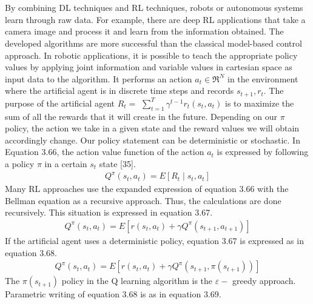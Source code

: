 \documentclass[12pt,twoside,a4]{mwbk}
\begin{document}
\\ \\
By combining DL techniques and RL techniques, robots or autonomous systems learn through raw data. For example, there are deep RL applications that take a camera image and process it and learn from the information obtained. The developed algorithms are more successful than the classical model-based control approach. In robotic applications, it is possible to teach the appropriate policy values by applying joint information and variable values in cartesian space as input data to the algorithm. It performs an action $a_{t} \in \mathfrak{R}^{N}$ in the environment where the artificial agent is in discrete time steps and records $s_{t+1}, r_{t}$. The purpose of the artificial agent $R_{t}=$ $\sum_{t=1}^{T} \gamma^{t-1} r_{t}\left(s_{t}, a_{t}\right)$ is to maximize the sum of all the rewards that it will create in the future. Depending on our $\pi$ policy, the action we take in a given state and the reward values we will obtain accordingly change. Our policy statement can be deterministic or stochastic. In Equation 3.66, the action value function of the action $a_{t}$ is expressed by following a policy $\pi$ in a certain $s_{t}$ state [35].
\begin{subequations}
\begin{align}
    Q^{\pi}\left(s_{t}, a_{t}\right)=E\left[R_{t} \mid s_{t}, a_{t}\right]
\end{align}
\end{subequations}
Many RL approaches use the expanded expression of equation 3.66 with the Bellman equation as a recursive approach. Thus, the calculations are done recursively. This situation is expressed in equation 3.67.
\begin{subequations}
\begin{align}
    Q^{\pi}\left(s_{t}, a_{t}\right)=E\left[r\left(s_{t}, a_{t}\right)+\gamma Q^{\pi}\left(s_{t+1}, a_{t+1}\right)\right]
\end{align}
\end{subequations}
If the artificial agent uses a deterministic policy, equation 3.67 is expressed as in equation 3.68.
\begin{subequations}
\begin{align}
    Q^{\pi}\left(s_{t}, a_{t}\right)=E\left[r\left(s_{t}, a_{t}\right)+\gamma Q^{\pi}\left(s_{t+1}, \pi\left(s_{t+1}\right)\right)\right]
\end{align}
\end{subequations}
The $\pi\left(s_{t+1}\right)$ policy in the Q learning algorithm is the $\varepsilon-$ greedy approach. Parametric writing of equation 3.68 is as in equation 3.69.
\end{document}
